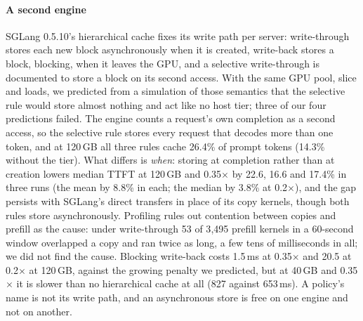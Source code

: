 \paragraph{A second engine} SGLang 0.5.10's hierarchical cache fixes its write path per server: write-through
stores each new block asynchronously when it is created, write-back stores a block, blocking, when it leaves the
GPU, and a selective write-through is documented to store a block on its second access. With the same GPU
pool, slice and loads, we predicted from a simulation of those semantics that the selective rule would store
almost nothing and act like no host tier; three of our four predictions failed. The engine counts a request's
own completion as a second access, so the selective rule stores every request that decodes more than one token,
and at 120\,GB all three rules cache 26.4\% of prompt tokens (14.3\% without the tier). What differs is
\emph{when}: storing at completion rather than at creation lowers median TTFT at 120\,GB and 0.35$\times$ by
22.6, 16.6 and 17.4\% in three runs (the mean by 8.8\% in each; the median by 3.8\% at 0.2$\times$), and the gap
persists with SGLang's direct transfers in place of its copy kernels, though both rules store asynchronously.
Profiling rules out contention between copies and prefill as the cause: under write-through 53 of 3{,}495
prefill kernels in a 60-second window overlapped a copy and ran twice as long, a few tens of milliseconds in
all; we did not find the cause. Blocking write-back costs 1.5\,ms at
0.35$\times$ and 20.5 at 0.2$\times$ at 120\,GB, against the growing penalty we predicted, but at 40\,GB and
0.35$\times$ it is slower than no hierarchical cache at all (827 against 653\,ms). A policy's name is not its
write path, and an asynchronous store is free on one engine and not on another.
